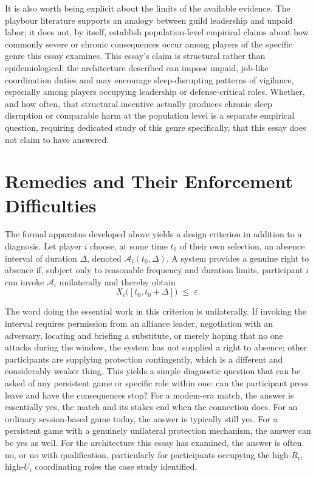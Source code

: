 \documentclass[11pt]{article}
\begin{document}
It is also worth being explicit about the limits of the available evidence. The playbour literature supports an analogy between guild leadership and unpaid labor; it does not, by itself, establish population-level empirical claims about how commonly severe or chronic consequences occur among players of the specific genre this essay examines. This essay's claim is structural rather than epidemiological: the architecture described can impose unpaid, job-like coordination duties and may encourage sleep-disrupting patterns of vigilance, especially among players occupying leadership or defense-critical roles. Whether, and how often, that structural incentive actually produces chronic sleep disruption or comparable harm at the population level is a separate empirical question, requiring dedicated study of this genre specifically, that this essay does not claim to have answered.

\section{Remedies and Their Enforcement Difficulties}

The formal apparatus developed above yields a design criterion in addition to a diagnosis. Let player $i$ choose, at some time $t_0$ of their own selection, an absence interval of duration $\Delta$, denoted $\mathcal{A}_i(t_0, \Delta)$. A system provides a genuine right to absence if, subject only to reasonable frequency and duration limits, participant $i$ can invoke $\mathcal{A}_i$ unilaterally and thereby obtain
\[
X_i\bigl([t_0, t_0+\Delta]\bigr) \;\le\; \varepsilon.
\]
\begin{center}
\end{center}
The word doing the essential work in this criterion is unilaterally. If invoking the interval requires permission from an alliance leader, negotiation with an adversary, locating and briefing a substitute, or merely hoping that no one attacks during the window, the system has not supplied a right to absence; other participants are supplying protection contingently, which is a different and considerably weaker thing. This yields a simple diagnostic question that can be asked of any persistent game or specific role within one: can the participant press leave and have the consequences stop? For a modem-era match, the answer is essentially yes, the match and its stakes end when the connection does. For an ordinary session-based game today, the answer is typically still yes. For a persistent game with a genuinely unilateral protection mechanism, the answer can be yes as well. For the architecture this essay has examined, the answer is often no, or no with qualification, particularly for participants occupying the high-$R_i$, high-$U_i$ coordinating roles the case study identified.
\end{document}
